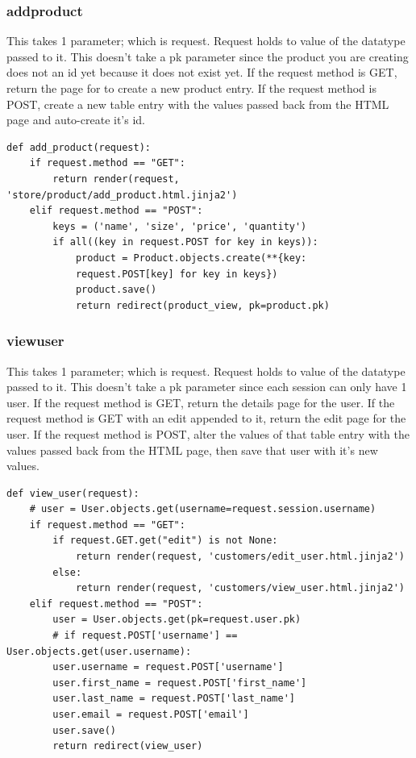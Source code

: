 \subsubsection{add\textunderscore product}
This takes 1 parameter; which is request. Request holds to value of the datatype passed to it. This doesn't take a pk parameter since the product you are creating does not an id yet because it does not exist yet.
If the request method is GET, return the page for to create a new product entry.
If the request method is POST, create a new table entry with the values passed back from the HTML page and auto-create it's id.
\begin{verbatim}
def add_product(request):
    if request.method == "GET":
        return render(request, 'store/product/add_product.html.jinja2')
    elif request.method == "POST":
        keys = ('name', 'size', 'price', 'quantity')
        if all((key in request.POST for key in keys)):
            product = Product.objects.create(**{key:
            request.POST[key] for key in keys})
            product.save()
            return redirect(product_view, pk=product.pk)
\end{verbatim}
\subsubsection{view\textunderscore user}
This takes 1 parameter; which is request. Request holds to value of the datatype passed to it. This doesn't take a pk parameter since each session can only have 1 user.
If the request method is GET, return the details page for the user.
If the request method is GET with an edit appended to it, return the edit page for the user.
If the request method is POST, alter the values of that table entry with the values passed back from the HTML page, then save that user with it's new values.
\begin{verbatim}
def view_user(request):
    # user = User.objects.get(username=request.session.username)
    if request.method == "GET":
        if request.GET.get("edit") is not None:
            return render(request, 'customers/edit_user.html.jinja2')
        else:
            return render(request, 'customers/view_user.html.jinja2')
    elif request.method == "POST":
        user = User.objects.get(pk=request.user.pk)
        # if request.POST['username'] == User.objects.get(user.username):
        user.username = request.POST['username']
        user.first_name = request.POST['first_name']
        user.last_name = request.POST['last_name']
        user.email = request.POST['email']
        user.save()
        return redirect(view_user)
\end{verbatim}
